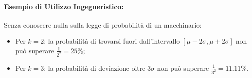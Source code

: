 \paragraph{Esempio di Utilizzo Ingegneristico:}
Senza conoscere nulla sulla legge di probabilità di un macchinario:
\begin{itemize}
    \item Per $k = 2$: la probabilità di trovarsi fuori dall'intervallo $[\mu - 2\sigma, \mu + 2\sigma]$ non può superare $\frac{1}{2^2} = 25\%$;
    \item Per $k = 3$: la probabilità di deviazione oltre $3\sigma$ non può superare $\frac{1}{3^2} = 11.11\%$.
\end{itemize}
